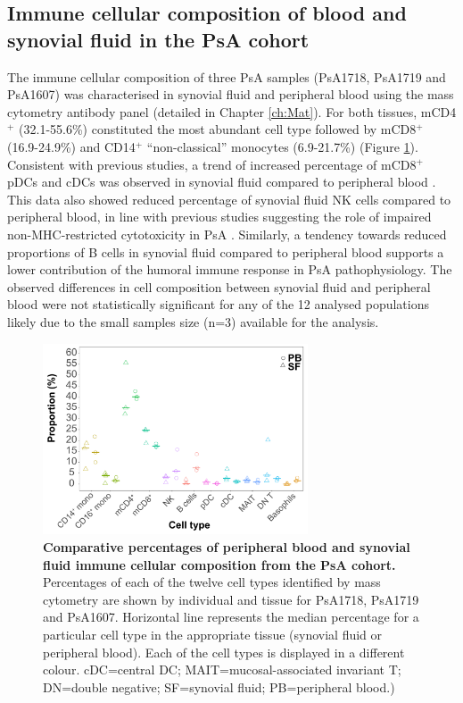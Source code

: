 \subsection{Immune cellular composition of blood and synovial fluid in the PsA cohort}
The immune cellular composition of three PsA samples (PsA1718, PsA1719 and PsA1607) was characterised in synovial fluid and peripheral blood using the mass cytometry antibody panel (detailed in Chapter \ref{ch:Mat}). For both tissues, mCD4$^+$ (32.1-55.6\%) constituted the most abundant cell type followed by mCD8$^+$ (16.9-24.9\%) and CD14$^+$ ``non-classical'' monocytes (6.9-21.7\%) (Figure \ref{figure:PsA_cell_composition}). Consistent with previous studies, a trend of increased percentage of mCD8$^+$ pDCs and cDCs was observed in synovial fluid compared to peripheral blood \parencite{Ross2000,Jongbloed2006}. This data also showed reduced percentage of synovial fluid NK cells compared to peripheral blood, in line with previous studies suggesting the role of impaired non-MHC-restricted cytotoxicity in PsA \parencite{Spadaro2004}. Similarly, a tendency towards reduced proportions of B cells in synovial fluid compared to peripheral blood supports a lower contribution of the humoral immune response in PsA pathophysiology. The observed differences in cell composition between synovial fluid and peripheral blood were not statistically significant for any of the 12 analysed populations likely due to the small samples size (n=3) available for the analysis. 

\begin{figure}[H]
\centering
\includegraphics[width=0.7\textwidth]{./Results3/pdfs/PSA_ATAC_cohort_cell_type_composition_boxplots}
\caption[Comparative percentages of peripheral blood and synovial fluid immune cellular composition from the PsA cohort.]{\textbf{Comparative percentages of peripheral blood and synovial fluid immune cellular composition from the PsA cohort.} Percentages of each of the twelve cell types identified by mass cytometry are shown by individual and tissue for PsA1718, PsA1719 and PsA1607. Horizontal line represents the median percentage for a particular cell type in the appropriate tissue (synovial fluid or peripheral blood). Each of the cell types is displayed in a different colour. cDC=central DC; MAIT=mucosal-associated invariant T; DN=double negative; SF=synovial fluid; PB=peripheral blood.)}
\label{figure:PsA_cell_composition}
\end{figure}



